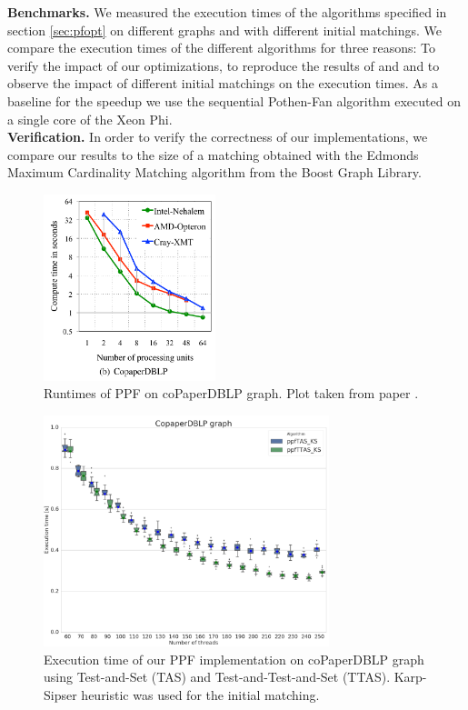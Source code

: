 \documentclass[letterpaper]{article}
\newcommand{\mypar}[1]{{\bf #1.}}
\begin{document}
\mypar{Benchmarks}
We measured the execution times of the algorithms specified in section \ref{sec:pfopt} on different graphs and with different initial matchings. We compare the execution times of the different algorithms for three reasons: To verify the impact of our optimizations, to reproduce the results of \cite{Azad:2012} and \cite{Azad:2015} and to observe the impact of different initial matchings on the execution times. As a baseline for the speedup we use the sequential Pothen-Fan algorithm executed on a single core of the Xeon Phi.\\

\mypar{Verification}
In order to verify the correctness of our implementations, we compare our results to the size of a matching obtained with the Edmonds Maximum Cardinality Matching algorithm \cite{BoostEdmonds} from the Boost Graph Library.\\


\begin{figure}\centering
	\includegraphics[width=5cm]{../../plot/output/report/coPaperAzadPlot.png}
    \caption{Runtimes of PPF on coPaperDBLP graph. Plot taken from paper \cite{Azad:2012}.}
	\label{fig:azadCopaper}
\end{figure}


\begin{figure}\centering
	\includegraphics[width=8.3cm]{../../plot/output/report/coPaperDBLP_PPFTASvsPPFTTAS.png}
    \caption{Execution time of our PPF implementation on coPaperDBLP graph using Test-and-Set (TAS) and Test-and-Test-and-Set (TTAS). Karp-Sipser heuristic was used for the initial matching.}
	\label{fig:tasvsttas}
\end{figure}
\end{document}
